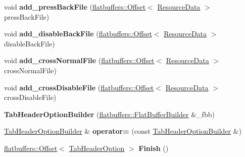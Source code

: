 \begin{DoxyCompactItemize}
void {\bfseries add\+\_\+press\+Back\+File} (\hyperlink{structflatbuffers_1_1Offset}{flatbuffers\+::\+Offset}$<$ \hyperlink{structflatbuffers_1_1ResourceData}{Resource\+Data} $>$ press\+Back\+File)
\item 
\mbox{\label{structflatbuffers_1_1TabHeaderOptionBuilder_acd0e792a24c8fb382a4b2196ad886321}} 
void {\bfseries add\+\_\+disable\+Back\+File} (\hyperlink{structflatbuffers_1_1Offset}{flatbuffers\+::\+Offset}$<$ \hyperlink{structflatbuffers_1_1ResourceData}{Resource\+Data} $>$ disable\+Back\+File)
\item 
\mbox{\label{structflatbuffers_1_1TabHeaderOptionBuilder_a8dd5b1bd89ae14e0e66d68250aaea175}} 
void {\bfseries add\+\_\+cross\+Normal\+File} (\hyperlink{structflatbuffers_1_1Offset}{flatbuffers\+::\+Offset}$<$ \hyperlink{structflatbuffers_1_1ResourceData}{Resource\+Data} $>$ cross\+Normal\+File)
\item 
\mbox{\label{structflatbuffers_1_1TabHeaderOptionBuilder_ad3d1e17e056f992450696757c82832be}} 
void {\bfseries add\+\_\+cross\+Disable\+File} (\hyperlink{structflatbuffers_1_1Offset}{flatbuffers\+::\+Offset}$<$ \hyperlink{structflatbuffers_1_1ResourceData}{Resource\+Data} $>$ cross\+Disable\+File)
\item 
\mbox{\label{structflatbuffers_1_1TabHeaderOptionBuilder_aebf76697af86514939c2abda86a9b5f7}} 
{\bfseries Tab\+Header\+Option\+Builder} (\hyperlink{classflatbuffers_1_1FlatBufferBuilder}{flatbuffers\+::\+Flat\+Buffer\+Builder} \&\+\_\+fbb)
\item 
\mbox{\label{structflatbuffers_1_1TabHeaderOptionBuilder_a9b2a96e30c72d886e7af1c1f82549634}} 
\hyperlink{structflatbuffers_1_1TabHeaderOptionBuilder}{Tab\+Header\+Option\+Builder} \& {\bfseries operator=} (const \hyperlink{structflatbuffers_1_1TabHeaderOptionBuilder}{Tab\+Header\+Option\+Builder} \&)
\item 
\mbox{\label{structflatbuffers_1_1TabHeaderOptionBuilder_ab2376986983ccd2f839d982701a703d8}} 
\hyperlink{structflatbuffers_1_1Offset}{flatbuffers\+::\+Offset}$<$ \hyperlink{structflatbuffers_1_1TabHeaderOption}{Tab\+Header\+Option} $>$ {\bfseries Finish} ()
\end{DoxyCompactItemize}
